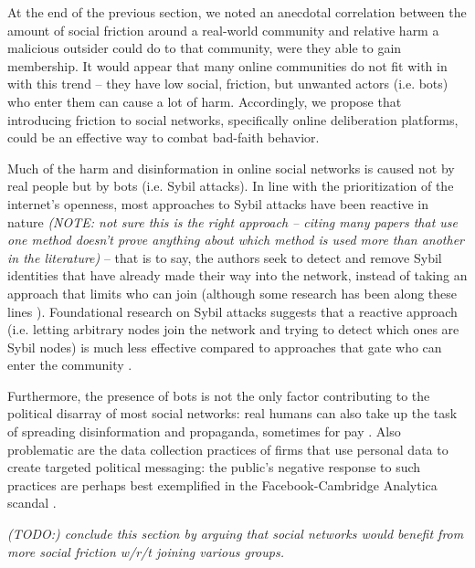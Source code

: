 \documentclass[sigconf,authordraft]{acmart}
\begin{document}
At the end of the previous section, we noted an anecdotal correlation between the amount of social friction around a real-world community and relative harm a malicious outsider could do to that community, were they able to gain membership. It would appear that many online communities do not fit with in with this trend -- they have low social, friction, but unwanted actors (i.e. bots) who enter them can cause a lot of harm. Accordingly, we propose that introducing friction to social networks, specifically online deliberation platforms, could be an effective way to combat bad-faith behavior.

Much of the harm and disinformation in online social networks is caused not by real people but by bots (i.e. Sybil attacks). In line with the prioritization of the internet's openness, most approaches to Sybil attacks have been reactive in nature \cite{al2017sybil,Wei2012sybildefender,boshmaf2015integro,cao2012aiding,cao2013sybilfence,shi2013sybilshield, danezis2009sybilinfer,yang2014uncovering,wang2012social,varol2017online, lingam2018detection}\textit{(NOTE: not sure this is the right approach -- citing many papers that use one method doesn't prove anything about which method is used more than another in the literature)} -- that is to say, the authors seek to detect and remove Sybil identities that have already made their way into the network, instead of taking an approach that limits who can join (although some research has been along these lines \cite{yu2006sybilguard,yu2008sybillimit,Tran2011Gatekeeper}). Foundational research on Sybil attacks suggests that a reactive approach (i.e. letting arbitrary nodes join the network and trying to detect which ones are Sybil nodes) is much less effective compared to approaches that gate who can enter the community \cite{douceur2002sybil}. 

Furthermore, the presence of bots is not the  only factor contributing to the political disarray of most social networks: real humans can also take up the task of spreading disinformation and propaganda, sometimes for pay \cite{bradshaw2017troops}. Also problematic are the data collection practices of firms that use personal data to create targeted political messaging: the public's negative response to such practices are perhaps best exemplified in the Facebook-Cambridge Analytica scandal \cite{CambridgeAnalyticaNYT}.



\textit{(TODO:) conclude this section by arguing that social networks would benefit from more social friction w/r/t joining various groups.}
\end{document}
